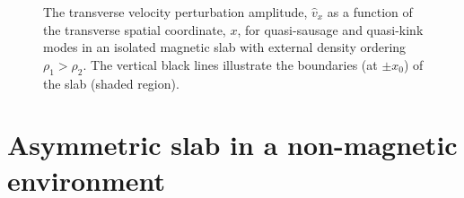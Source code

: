 \documentclass[12pt,draft]{../style-files/ociamthesis}
\begin{document}
\begin{figure}
{{{
				\label{fig: body quasi-saus}}}}
	\caption{The transverse velocity perturbation amplitude, $\widehat{v}_x$ as a function of the transverse spatial coordinate, $x$, for quasi-sausage and quasi-kink modes in an isolated magnetic slab with external density ordering $\rho_1 > \rho_2$. The vertical black lines illustrate the boundaries (at $\pm x_0$) of the slab (shaded region).}
\end{figure}


\section{Asymmetric slab in a non-magnetic environment}
\label{sec: EVP non-mag}
\end{document}
